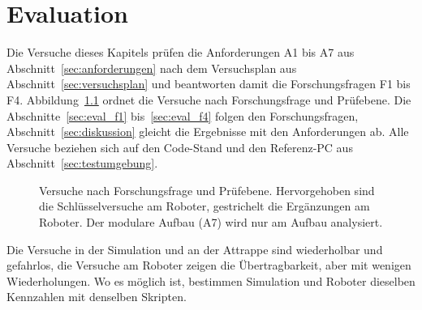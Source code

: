\chapter{Evaluation}
\label{chap:evaluation}

Die Versuche dieses Kapitels prüfen die Anforderungen A1 bis A7 aus Abschnitt~\ref{sec:anforderungen} nach dem Versuchsplan aus Abschnitt~\ref{sec:versuchsplan} und beantworten damit die Forschungsfragen F1 bis F4.
Abbildung~\ref{fig:eval_ueberblick} ordnet die Versuche nach Forschungsfrage und Prüfebene.
Die Abschnitte~\ref{sec:eval_f1} bis~\ref{sec:eval_f4} folgen den Forschungsfragen, Abschnitt~\ref{sec:diskussion} gleicht die Ergebnisse mit den Anforderungen ab.
Alle Versuche beziehen sich auf den Code-Stand und den Referenz-PC aus Abschnitt~\ref{sec:testumgebung}.

\begin{figure}[htbp]
  \centering
  
  \caption[Versuche nach Forschungsfrage und Prüfebene]{Versuche nach Forschungsfrage und Prüfebene. Hervorgehoben sind die Schlüsselversuche am Roboter, gestrichelt die Ergänzungen am Roboter. Der modulare Aufbau (A7) wird nur am Aufbau analysiert.}
  \label{fig:eval_ueberblick}
\end{figure}

Die Versuche in der Simulation und an der Attrappe sind wiederholbar und gefahrlos, die Versuche am Roboter zeigen die Übertragbarkeit, aber mit wenigen Wiederholungen.
Wo es möglich ist, bestimmen Simulation und Roboter dieselben Kennzahlen mit denselben Skripten.

